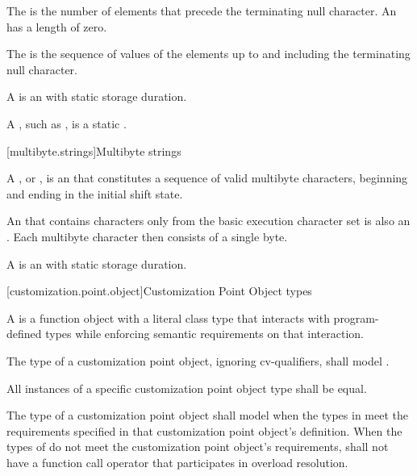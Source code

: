 \pnum
The 
is the number of elements that
precede the terminating null character.
An 
has a length of zero.

\pnum
The 
is the sequence of values of the
elements up to and including the terminating null character.

\pnum
A 
is an \ntbs{} with
static storage duration.
\begin{footnote}
A , such as
,
is a static \ntbs{}.
\end{footnote}

[multibyte.strings]{Multibyte strings}

%
\pnum
A ,
or \ntmbs{},
is an \ntbs{} that constitutes a
sequence of valid multibyte characters, beginning and ending in the initial
shift state.
\begin{footnote}
An \ntbs{} that contains characters only from the
basic execution character set is also an \ntmbs{}.
Each multibyte character then
consists of a single byte.
\end{footnote}

\pnum
A 
is an \ntmbs{} with static storage duration.

[customization.point.object]{Customization Point Object types}

\pnum
A  is a function object
with a literal class type that interacts with program-defined types while
enforcing semantic requirements on that interaction.

\pnum
The type of a customization point object, ignoring cv-qualifiers, shall model
.

\pnum
All instances of a specific customization point object type shall
be equal.

\pnum
The type  of a customization point object shall model
when the types in  meet the requirements specified in that
customization point object's definition. When the types of  do
not meet the customization point object's requirements,  shall not have
a function call operator that participates in overload resolution.

